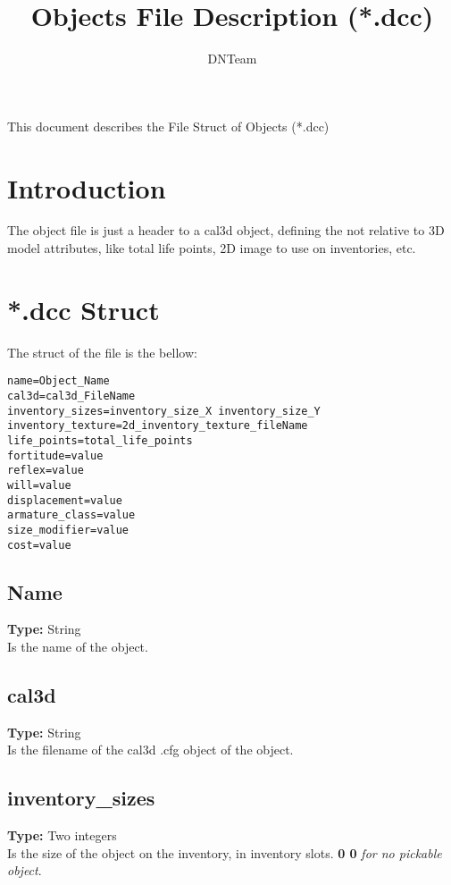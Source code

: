 \documentclass[letterpaper,12pt]{article}
\begin{document}
\title{Objects File Description (*.dcc)}

\author{
DNTeam
}

\maketitle

\abstract
{
   \begin{center}
      This document describes the File Struct of Objects (*.dcc)
   \end{center}
}

\newpage

\tableofcontents

\newpage


\section{Introduction}

The object file is just a header to a cal3d object, defining the not relative
to 3D model attributes, like total life points, 2D image to use on inventories,
etc.

\section{*.dcc Struct}

The struct of the file is the bellow:

\begin{verbatim}
name=Object_Name
cal3d=cal3d_FileName
inventory_sizes=inventory_size_X inventory_size_Y
inventory_texture=2d_inventory_texture_fileName
life_points=total_life_points
fortitude=value
reflex=value
will=value
displacement=value
armature_class=value
size_modifier=value
cost=value
\end{verbatim}

\subsection{Name}
{\bf Type:} String\\
Is the name of the object.

\subsection{cal3d}
{\bf Type:} String\\
Is the filename of the cal3d .cfg object of the object.

\subsection{inventory\_sizes}
{\bf Type:} Two integers\\
Is the size of the object on the inventory, in inventory slots. {\bf 0 0} {\it
for no pickable object}.
\end{document}
